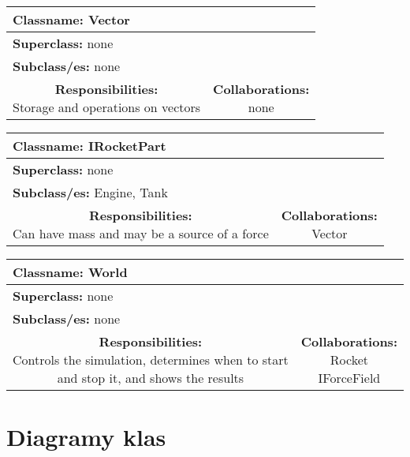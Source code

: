 \documentclass{article}
\begin{document}
\begin {center}
\begin{tabular}{|c|c|}
\hline
\multicolumn{2}{|l|}{\textbf{Classname:} Vector}\\
\hline
\multicolumn{2}{|l|}{\textbf{Superclass:} none}\\
\multicolumn{2}{|l|}{\textbf{Subclass/es:} none}\\
\hline
\parbox[]{5cm}{\textbf{Responsibilities:} \\Storage and operations on vectors} & \parbox[]{5cm}{\textbf{Collaborations:}\\none}\\
\hline
 \end{tabular}\vspace{.4cm}

\begin{tabular}{|c|c|}
\hline
\multicolumn{2}{|l|}{\textbf{Classname:} IRocketPart}\\
\hline
\multicolumn{2}{|l|}{\textbf{Superclass:} none}\\
\multicolumn{2}{|l|}{\textbf{Subclass/es:} Engine, Tank}\\
\hline
\parbox[]{5cm}{\textbf{Responsibilities:} \\Can have mass and may be a source of a force} & \parbox[]{5cm}{\textbf{Collaborations:}\\Vector}\\
\hline
 \end{tabular}\vspace{.4cm}

\begin{tabular}{|c|c|}
\hline
\multicolumn{2}{|l|}{\textbf{Classname:} World}\\
\hline
\multicolumn{2}{|l|}{\textbf{Superclass:} none}\\
\multicolumn{2}{|l|}{\textbf{Subclass/es:} none}\\
\hline
\parbox[]{5cm}{\textbf{Responsibilities:} \\Controls the simulation, determines when to start and stop it, and shows the results} & \parbox[]{5cm}{\textbf{Collaborations:}\\Rocket\\IForceField}\\
\hline
 \end{tabular}\vspace{.4cm}

\end{center}

\section{Diagramy klas}
\end{document}
